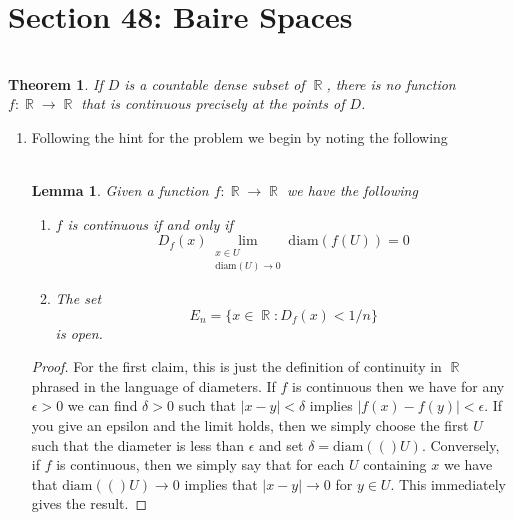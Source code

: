 \documentclass{article}
\DeclareMathOperator{\R}{\mathbb{R}}
\DeclareMathOperator{\suchthat}{\mathrel{:}}
\newcommand{\exercise}[1]{\noindent{\textbf{Exercise #1:}}}
\newcommand{\diam}[1]{\text{diam}(#1)}
\newtheorem*{thm}{\\ Theorem}
\newtheorem*{lem}{\\ Lemma}
\begin{document}
\section{Section 48: Baire Spaces}
\exercise{48.7}
\begin{thm}
  If $D$ is a countable dense subset of $\R$, there is no function $f:
  \R \to \R$ that is continuous precisely at the points of $D$.
\end{thm}
\begin{enumerate}
\item [\textbf{(a)}] Following the hint for the problem we begin by
  noting the following
  \begin{lem}
    Given a function $f: \R \to \R$ we have the following
    \begin{enumerate}
    \item[\textbf{(i)}] $f$ is continuous if and only if
      \[
      D_f(x)\lim_{\substack{x\in U\\ \diam{U} \to 0}} \diam{f(U)} = 0
      \]
    \item[\textbf{(ii)}] The set
      \[
      E_n = \{x \in \R \suchthat D_f(x) < 1/n\}
      \]
      is open.
    \end{enumerate}
  \end{lem}
  \begin{proof}
    For the first claim, this is just the definition of continuity in
    $\R$ phrased in the language of diameters. If $f$ is continuous
    then we have for any $\epsilon > 0$ we can find $\delta > 0$ such
    that $|x-y| < \delta$ implies $|f(x) - f(y)| < \epsilon$. If you
    give an epsilon and the limit holds, then we simply choose the
    first $U$ such that the diameter is less than $\epsilon$ and set
    $\delta = \diam(U)$. Conversely, if $f$ is continuous, then we
    simply say that for each $U$ containing $x$ we have that $\diam(U)
    \to 0$ implies that $|x-y| \to 0$ for $y \in U$. This immediately
    gives the result.


\end{proof}
\end{enumerate}
\end{document}
